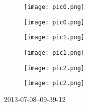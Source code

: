 \documentclass[10pt,a6paper,DIV=60]{scrartcl}
\begin{document}
\begin{figure}[h]
  \begin{minipage}[b]{0.48\linewidth}
    \texttt{[image: pic0.png]}
  \end{minipage}
  \hfill
  \begin{minipage}[b]{0.48\linewidth}
    \texttt{[image: pic0.png]}
  \end{minipage}
\end{figure}
\vspace{-1em}
\begin{figure}[h]
  \begin{minipage}[b]{0.48\linewidth}
    \texttt{[image: pic1.png]}
  \end{minipage}
  \hfill
  \begin{minipage}[b]{0.48\linewidth}
    \texttt{[image: pic1.png]}
  \end{minipage}
\end{figure}
\vspace{-1em}
\begin{figure}[h]
  \begin{minipage}[b]{0.48\linewidth}
    \texttt{[image: pic2.png]}
  \end{minipage}
  \hfill
  \begin{minipage}[b]{0.48\linewidth}
    \texttt{[image: pic2.png]}
  \end{minipage}
\end{figure}
\vfill
\tiny{2013-07-08--09-39-12}
\end{document}
